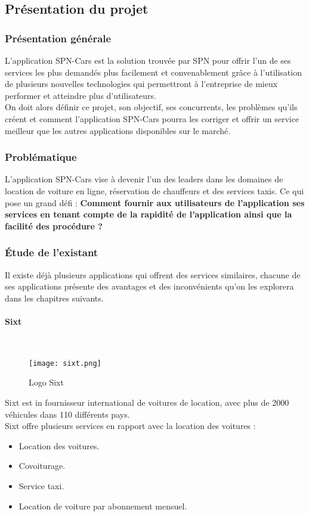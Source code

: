 \subsection{Présentation du projet}
\subsubsection{Présentation générale}
L'application SPN-Cars est la solution trouvée par SPN pour offrir l'un de ses services les plus demandés plus facilement et convenablement grâce à l'utilisation de plusieurs nouvelles technologies qui permettront à l'entreprise de mieux performer et atteindre plus d'utilisateurs.\\
\noindent On doit alors définir ce projet, son objectif, ses concurrents, les problèmes qu'ils créent et comment l'application SPN-Cars pourra les corriger et offrir un service meilleur que les autres applications disponibles sur le marché.
\subsubsection{Problématique}
L'application SPN-Cars vise à devenir l'un des leaders dans les domaines de location de voiture en ligne, réservation de chauffeurs et des services taxis. Ce qui pose un grand défi : \textbf{Comment fournir aux utilisateurs de l'application ses services en tenant compte de la rapidité de l'application ainsi que la facilité des procédure ?}
\subsubsection{Étude de l'existant}
Il existe déjà plusieurs applications qui offrent des services similaires, chacune de ses applications présente des avantages et des inconvénients qu'on les explorera dans les chapitres suivants.
\paragraph{Sixt}\mbox{} \\
\vspace{1cm}
\begin{figure}[H]
    \centering
    \texttt{[image: sixt.png]}
    \vspace{0.5cm}
    \caption{Logo Sixt}
    \label{fig:sixt_logo}
\end{figure}
\vspace{1cm}
Sixt est in fournisseur international de voitures de location, avec plus de 2000 véhicules dans 110 différents pays.\\
\noindent Sixt offre plusieurs services en rapport avec la location des voitures :
\begin{itemize}
    \item Location des voitures.
    \item Covoiturage.
    \item Service taxi.
    \item Location de voiture par abonnement mensuel.
\end{itemize}
